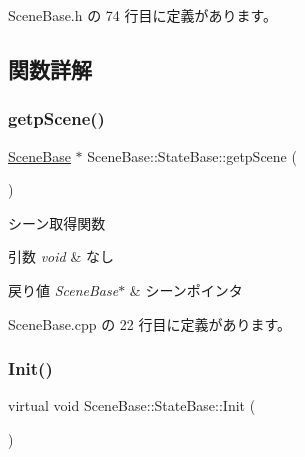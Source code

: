  Scene\+Base.\+h の 74 行目に定義があります。



\subsection{関数詳解}
\mbox{\label{class_scene_base_1_1_state_base_a5333fd722f17c6da71b09afdc56c84b4}} 
\subsubsection{\texorpdfstring{getp\+Scene()}{getpScene()}}
{\footnotesize\ttfamily \mbox{\hyperlink{class_scene_base}{Scene\+Base}} $\ast$ Scene\+Base\+::\+State\+Base\+::getp\+Scene (\begin{DoxyParamCaption}{ }\end{DoxyParamCaption})}



シーン取得関数 


\begin{DoxyParams}{引数}
{\em void} & なし \\
\hline
\end{DoxyParams}

\begin{DoxyRetVals}{戻り値}
{\em Scene\+Base$\ast$} & シーンポインタ \\
\hline
\end{DoxyRetVals}


 Scene\+Base.\+cpp の 22 行目に定義があります。

\mbox{\label{class_scene_base_1_1_state_base_a33350231b039a2178c19beac0211c5b8}} 
\subsubsection{\texorpdfstring{Init()}{Init()}}
{\footnotesize\ttfamily virtual void Scene\+Base\+::\+State\+Base\+::\+Init (\begin{DoxyParamCaption}{ }\end{DoxyParamCaption})\hspace{0.3cm}{\ttfamily [pure virtual]}}



